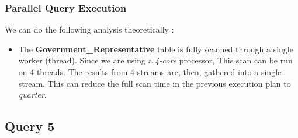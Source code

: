 \subsubsection{Parallel Query Execution}
We can do the following analysis theoretically :
\begin{itemize}
    \item The \textbf{Government\_Representative} table is fully scanned through a single worker (thread). Since we are using a \emph{4-core} processor, This scan can be run on 4 threads. The results from 4 streams are, then, gathered into a single stream. This can reduce the full scan time in the previous execution plan to \emph{quarter}.
\end{itemize}

\subsection{Query 5}

